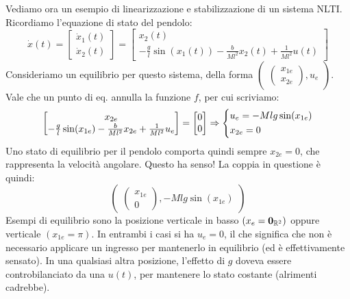 \documentclass[a4paper]{report}
\begin{document}
\begin{esem}
	Vediamo ora un esempio di linearizzazione e stabilizzazione di un sistema NLTI. Ricordiamo l'equazione di stato del pendolo:
	\begin{equation*}
		\dot x(t) = \begin{bmatrix}
			\dot x_1(t) \\ \dot x_2 (t)
	\end{bmatrix} = \begin{bmatrix}
		x_2(t)\\
		-\frac{g}{l} \sin(x_1(t)) - \frac{b}{Ml^2} x_2(t) + \frac{1}{Ml^2}u(t)
	\end{bmatrix}
	\end{equation*}
	Consideriamo un equilibrio per questo sistema, della forma $\begin{pmatrix}\begin{pmatrix}
		x_{1e} \\ x_{2e}
	\end{pmatrix}, u_e
	\end{pmatrix}$. Vale che un punto di eq. annulla la funzione $f$, per cui scriviamo:
	\begin{equation*}
	\begin{bmatrix}
		x_{2e}\\
		-\frac{g}{l} \sin(x_{1e}) - \frac{b}{Ml^2} x_{2e} + \frac{1}{Ml^2}u_e
	\end{bmatrix} = \begin{bmatrix}
		0 \\ 0 
	\end{bmatrix} \Rightarrow \begin{dcases}
	u_e = - Mlg \sin(x_{1e})\\
		x_{2e} = 0
	\end{dcases}
	\end{equation*}
	Uno stato di equilibrio per il pendolo comporta quindi sempre $x_{2e} = 0$, che rappresenta la velocità angolare. Questo ha senso! La coppia in questione è quindi:
	\begin{equation*}
	\begin{pmatrix}
	\begin{pmatrix}
			x_{1e} \\ 0
	\end{pmatrix}, -Mlg\sin(x_{1e})
	\end{pmatrix}
	\end{equation*}
	Esempi di equilibrio sono la posizione verticale in basso $(x_e = \mathbf{0}_{\mathbb{R}^2})$ oppure verticale $(x_{1e} = \pi)$. In entrambi i casi si ha $u_e = 0$, il che significa che non è necessario applicare un ingresso per mantenerlo in equilibrio (ed è effettivamente sensato). In una qualsiasi altra posizione, l'effetto di $g$ doveva essere controbilanciato da una $u(t)$, per mantenere lo stato costante (alrimenti cadrebbe).

\end{esem}
\end{document}
